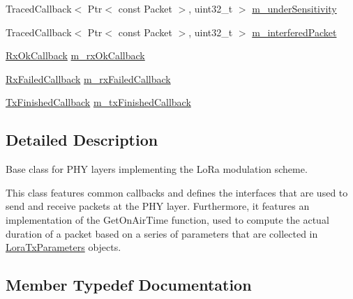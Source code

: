 \begin{DoxyCompactItemize}
\item 
Traced\+Callback$<$ Ptr$<$ const Packet $>$, uint32\+\_\+t $>$ \hyperlink{classns3_1_1lorawan_1_1LoraPhy_aac99cb9ce98149327c0cc3ead3979440}{m\+\_\+under\+Sensitivity}
\item 
Traced\+Callback$<$ Ptr$<$ const Packet $>$, uint32\+\_\+t $>$ \hyperlink{classns3_1_1lorawan_1_1LoraPhy_a39364c3c5adc16798f72bd0b31906d68}{m\+\_\+interfered\+Packet}
\item 
\hyperlink{classns3_1_1lorawan_1_1LoraPhy_ae9342f40d4eb2b1f004309f6fb444a50}{Rx\+Ok\+Callback} \hyperlink{classns3_1_1lorawan_1_1LoraPhy_afaa86274f61442506a553c7d877546f4}{m\+\_\+rx\+Ok\+Callback}
\item 
\hyperlink{classns3_1_1lorawan_1_1LoraPhy_a2229a4841f407ee9931e563622edf663}{Rx\+Failed\+Callback} \hyperlink{classns3_1_1lorawan_1_1LoraPhy_a3bac183478118ef0e29fcb3131733846}{m\+\_\+rx\+Failed\+Callback}
\item 
\hyperlink{classns3_1_1lorawan_1_1LoraPhy_a3dd8f8ea5717fc775dde00ad54f5402c}{Tx\+Finished\+Callback} \hyperlink{classns3_1_1lorawan_1_1LoraPhy_a5badac60ffec5754017967f96b2ffeb3}{m\+\_\+tx\+Finished\+Callback}
\end{DoxyCompactItemize}


\subsection{Detailed Description}
Base class for P\+HY layers implementing the Lo\+Ra modulation scheme.

This class features common callbacks and defines the interfaces that are used to send and receive packets at the P\+HY layer. Furthermore, it features an implementation of the Get\+On\+Air\+Time function, used to compute the actual duration of a packet based on a series of parameters that are collected in \hyperlink{structns3_1_1lorawan_1_1LoraTxParameters}{Lora\+Tx\+Parameters} objects. 

\subsection{Member Typedef Documentation}
\mbox{\label{classns3_1_1lorawan_1_1LoraPhy_a2229a4841f407ee9931e563622edf663}} 
